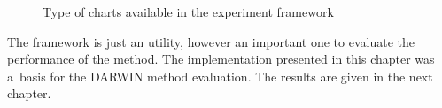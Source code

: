 \begin{figure}
  \centering
  \caption{Type of charts available in the experiment framework}
  \label{chart_examples2}
\end{figure}

The framework is just an utility, however an important one to evaluate the
performance of the method. The implementation presented in this chapter was
a~basis for the DARWIN method evaluation. The results are given in the next
chapter.
